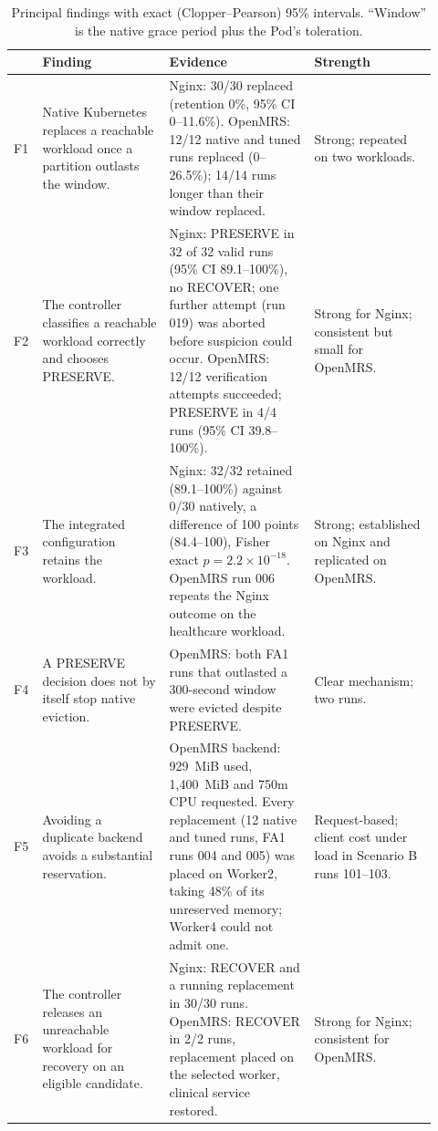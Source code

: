 \documentclass[10pt]{article}
\begin{document}
\begin{table}[ht]
\centering
\caption{Principal findings with exact (Clopper--Pearson) 95\% intervals. ``Window'' is the native grace period plus the Pod's toleration.\label{tab:principal-findings}}
\footnotesize
\begin{tabular}{@{}>{\RaggedRight\arraybackslash}p{0.04\linewidth}>{\RaggedRight\arraybackslash}p{0.29\linewidth}>{\RaggedRight\arraybackslash}p{0.32\linewidth}>{\RaggedRight\arraybackslash}p{0.27\linewidth}@{}}
\toprule
& Finding & Evidence & Strength\\ \midrule
F1 & Native Kubernetes replaces a reachable workload once a partition outlasts the window. & Nginx: 30/30 replaced (retention 0\%, 95\% CI 0--11.6\%). OpenMRS: 12/12 native and tuned runs replaced (0--26.5\%); 14/14 runs longer than their window replaced. & Strong; repeated on two workloads.\\
F2 & The controller classifies a reachable workload correctly and chooses PRESERVE. & Nginx: PRESERVE in 32 of 32 valid runs (95\% CI 89.1--100\%), no RECOVER; one further attempt (run 019) was aborted before suspicion could occur. OpenMRS: 12/12 verification attempts succeeded; PRESERVE in 4/4 runs (95\% CI 39.8--100\%). & Strong for Nginx; consistent but small for OpenMRS.\\
F3 & The integrated configuration retains the workload. & Nginx: 32/32 retained (89.1--100\%) against 0/30 natively, a difference of 100 points (84.4--100), Fisher exact $p=2.2\times10^{-18}$. OpenMRS run 006 repeats the Nginx outcome on the healthcare workload. & Strong; established on Nginx and replicated on OpenMRS.\\
F4 & A PRESERVE decision does not by itself stop native eviction. & OpenMRS: both FA1 runs that outlasted a 300-second window were evicted despite PRESERVE. & Clear mechanism; two runs.\\
F5 & Avoiding a duplicate backend avoids a substantial reservation. & OpenMRS backend: 929~MiB used, 1,400~MiB and 750m CPU requested. Every replacement (12 native and tuned runs, FA1 runs 004 and 005) was placed on Worker2, taking 48\% of its unreserved memory; Worker4 could not admit one. & Request-based; client cost under load in Scenario B runs 101--103.\\
F6 & The controller releases an unreachable workload for recovery on an eligible candidate. & Nginx: RECOVER and a running replacement in 30/30 runs. OpenMRS: RECOVER in 2/2 runs, replacement placed on the selected worker, clinical service restored. & Strong for Nginx; consistent for OpenMRS.\\

\end{tabular}
\end{table}
\end{document}
